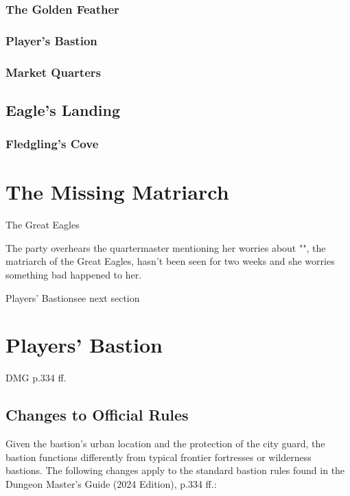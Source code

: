 \subsubsection*{ The Golden Feather}
\subsubsection*{ Player's Bastion}
\subsubsection*{ Market Quarters}
\subsection*{ Eagle's Landing}
\subsubsection*{ Fledgling's Cove}

\section*{The Missing Matriarch}
\begin{DndQuestHook}[width=0.5\textwidth - 4pt]{The Great Eagles}
	\DndQuestHookBasics[
		location = {Citadel of Crail},
		quest-giver = {Quartermaster of Crail and Ser Proletius},
		objective = {Find out what happened to the Great Eagle's matriarch},
	]
	
	{%
		\noindent\entryfont The party overhears the quartermaster mentioning her worries about "", the matriarch of the Great Eagles, hasn't been seen for two weeks and she worries something bad happened to her.
	}%
	
	{%
		{Players' Bastion}{see next section}%
	}%
\end{DndQuestHook}

\section*{Players' Bastion}
{\entryfont DMG p.334 ff.}
\subsection*{Changes to Official Rules}
{\entryfont Given the bastion's urban location and the protection of the city guard, the bastion functions differently from typical frontier fortresses or wilderness bastions. The following changes apply to the standard bastion rules found in the Dungeon Master's Guide (2024 Edition), p.334 ff.:}
